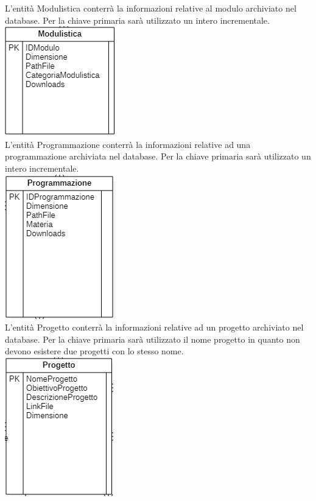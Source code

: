 \documentclass{article}
\begin{document}
    L'entità Modulistica conterrà la informazioni relative al modulo archiviato nel database. Per la chiave primaria sarà utilizzato un intero incrementale.\\
	\includegraphics[scale=0.5]{modulistica.png}\\
    L'entità Programmazione conterrà la informazioni relative ad una programmazione archiviata nel database. Per la chiave primaria sarà utilizzato un intero incrementale.\\
	\includegraphics[scale=0.5]{programmazione.png}\\
    L'entità Progetto conterrà la informazioni relative ad un progetto archiviato nel database. Per la chiave primaria sarà utilizzato il nome progetto in quanto non devono esistere due progetti con lo stesso nome.\\
	\includegraphics[scale=0.5]{progetto.png}\\
\end{document}
